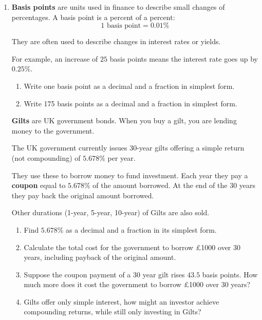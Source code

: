 \documentclass[12pt]{article}
\begin{document}
\begin{enumerate}[label=\textbf{Q\arabic*.}, start=4]

\item

\textbf{Basis points} are units used in finance to describe small changes of percentages. A basis point is a percent of a percent:  
\[
1 \text{ basis point} = 0.01\%
\]

They are often used to describe changes in interest rates or yields.

For example, an increase of \( 25 \) basis points means the interest rate goes up by \( 0.25\% \).

\medskip





\begin{enumerate}[label=(\alph*)]
    \item Write one basis point as a decimal and a fraction in simplest form.
    \item Write 175 basis points as a decimal and a fraction in simplest form.
\end{enumerate}

\bigskip
    \textbf{Gilts} are UK government bonds. When you buy a gilt, you are lending money to the government.  

    The UK government currently issues 30-year gilts offering a simple return (not compounding) of $5.678\%$ per year. 

    They use these to borrow money to fund investment. Each year they pay a \textbf{coupon} equal to $5.678\%$ of the amount borrowed. At the end of the 30 years they pay back the original amount borrowed. 
    
    Other durations (1-year, 5-year, 10-year) of Gilts are also sold.

\medskip

\begin{enumerate}[label=(\alph*), resume]
    \item Find $5.678\%$ as a decimal and a fraction in its simplest form.
    \item Calculate the total cost for the government to borrow £1000 over 30 years, including payback of the original amount.
    \item Suppose the coupon payment of a 30 year gilt rises \( 43.5 \) basis points. How much more does it cost the government to borrow £1000 over 30 years?
    \item Gilts offer only simple interest, how might an investor achieve compounding returns, while still only investing in Gilts?
\end{enumerate}


\end{enumerate}
\end{document}
